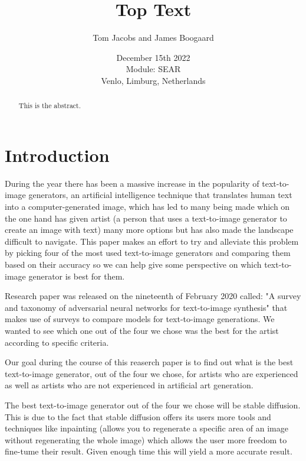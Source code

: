 \documentclass[]{report}
\title{Top Text}
\author{Tom Jacobs and James Boogaard}
\date{December 15th 2022 \\Module: SEAR \\Venlo, Limburg, Netherlands}
\begin{document}
	
	\maketitle
	
	\begin{abstract}
		This is the abstract.
		
		
	\end{abstract}
	
	\tableofcontents
	\setcounter{page}{3}
	\listoffigures %
	\pagebreak
	
	
	\section{Introduction}
	During the year there has been a massive increase in the popularity of text-to-image generators, an artificial intelligence technique that translates human text into a computer-generated image, which has led to many being made which on the one hand has given artist (a person that uses a text-to-image generator to create an image with text) many more options but has also made the landscape difficult to navigate. This paper makes an effort to try and alleviate this problem by picking four of the most used text-to-image generators and comparing them based on their accuracy so we can help give some perspective on which text-to-image generator is best for them.
	
	Research paper was released on the nineteenth of February 2020 called: "A survey and taxonomy of adversarial neural networks for text-to-image synthesis" that makes use of surveys to compare models for text-to-image generations. We wanted to see which one out of the four we chose was the best for the artist according to specific criteria.
	
	Our goal during the course of this reaserch paper is to find out what is the best text-to-image generator, out of the four we chose, for artists who are experienced as well as artists who are not experienced in artificial art generation.
	
	The best text-to-image generator out of the four we chose will be stable diffusion. This is due to the fact that stable diffusion offers its users more tools and techniques like inpainting (allows you to regenerate a specific area of an image without regenerating the whole image) which allows the user more freedom to fine-tume their result. Given enough time this will yield a more accurate result. 
	
\end{document}
